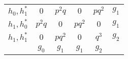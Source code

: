 \begin{table}[!b]
\begin{minipage}{0.5\textwidth}
\begin{tabular}[t]{c|c|c|c|c|c}
\rule{0pt}{3ex}\rule[-2ex]{0pt}{0pt}
  $h_{0}, h^*_{1}$   & $0$       & $p^{2}q$  & $0$       & $pq^{2}$  & $g_{1}$ \\ \cline{2-5}
\rule{0pt}{3ex}\rule[-2ex]{0pt}{0pt}
  $h_{1}, h^*_{0}$   & $p^{2}q$  & $0$       & $pq^{2}$  & $0$       & $g_{1}$ \\ \cline{2-5}
\rule{0pt}{3ex}\rule[-2ex]{0pt}{0pt}
  $h_{1}, h^*_{1}$   & $0$       & $pq^{2}$  & $0$       & $q^{3}$   & $g_{2}$ \\ \cline{2-5}
  \multicolumn{1}{c}{} &
\multicolumn{1}{c}{$g_{0}$} &
\multicolumn{1}{c}{$g_{1}$} &
\multicolumn{1}{c}{$g_{1}$} &
\multicolumn{1}{c}{$g_{2}$} &
\multicolumn{1}{c}{}
\end{tabular}
\end{minipage}

\end{table}
